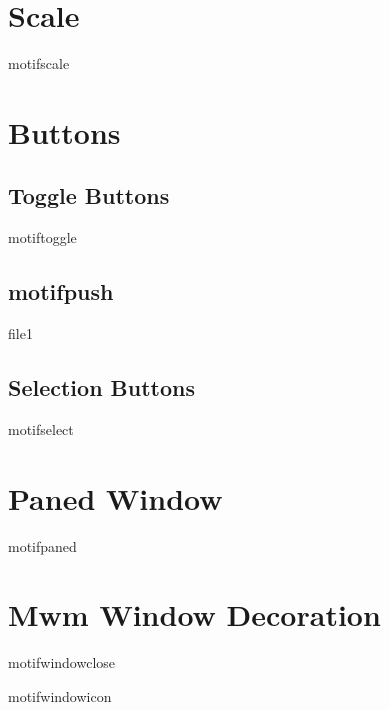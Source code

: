 \section{Scale}

\begin{PAWf}{motifscale}
\end{PAWf}


\section{Buttons}

\subsection{Toggle Buttons}

\begin{PAWf}{motiftoggle}
\end{PAWf}


\subsection{motifpush}

\begin{PAWf}{file1}
\end{PAWf}


\subsection{Selection Buttons}

\begin{PAWf}{motifselect}
\end{PAWf}


\section{Paned Window}

\begin{PAWf}{motifpaned}
\end{PAWf}


\section{Mwm Window Decoration}

\begin{PAWf}{motifwindowclose}
\end{PAWf}

\begin{PAWf}{motifwindowicon}
\end{PAWf}

   
\newpage
{}
\printindex



